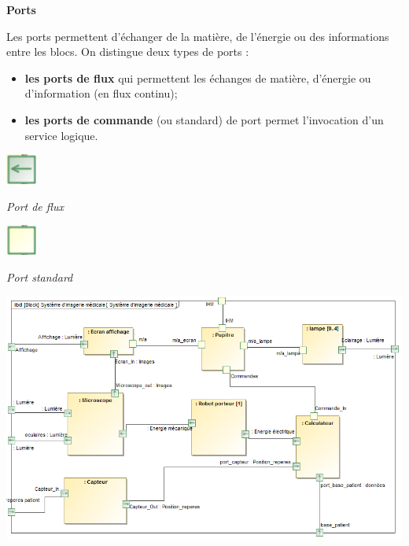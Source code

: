 \documentclass[11pt,oneside]{article}
\begin{document}
\begin{defi}
\textbf{Ports}

\begin{minipage}[c]{.65\linewidth}
Les ports permettent d'échanger de la matière, de l'énergie ou des informations entre les blocs. On distingue deux types de ports : 
\begin{itemize}
\item \textbf{les ports de flux} qui permettent les échanges de matière, d'énergie ou d'information (en flux continu);
\item \textbf{les ports de commande} (ou standard)  de port permet l'invocation d'un service logique.
\end{itemize}
\end{minipage}\hfill
\begin{minipage}[c]{.3\linewidth}
\begin{center}
\includegraphics[width=1cm]{png/flux}

\textit{Port de flux}
\end{center}

\begin{center}
\includegraphics[width=1cm]{png/standard}

\textit{Port standard}
\end{center}

\end{minipage}
\end{defi}

\begin{exemple}
\begin{center}
\includegraphics[width=.9\textwidth]{png/exemple}
\end{center}

\end{exemple}
\end{document}
